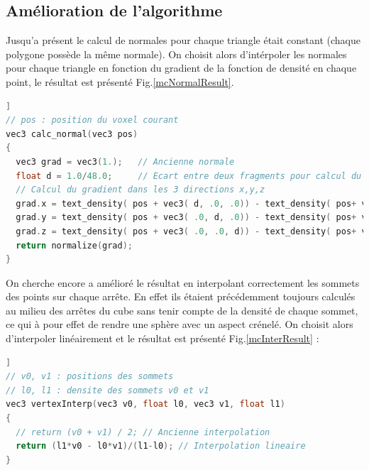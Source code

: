 \documentclass[a4paper]{article}
\begin{document}
\subsection{Amélioration de l'algorithme}

Jusqu'a présent le calcul de normales pour chaque triangle était constant (chaque polygone possède la même normale). On choisit alors d'intérpoler  les normales pour chaque triangle en fonction du gradient de la fonction de densité en chaque point, le résultat est présenté Fig.\ref{mcNormalResult}. 

\begin{lstlisting}[language=C++,
                   directivestyle={\color{black}}
                   emph={int,char,double,float,unsigned},
                   emphstyle={\color{blue}}
                  ]]
// pos : position du voxel courant
vec3 calc_normal(vec3 pos)
{
  vec3 grad = vec3(1.);   // Ancienne normale 
  float d = 1.0/48.0;     // Ecart entre deux fragments pour calcul du gradient
  // Calcul du gradient dans les 3 directions x,y,z
  grad.x = text_density( pos + vec3( d, .0, .0)) - text_density( pos+ vec3(-d, .0, .0));
  grad.y = text_density( pos + vec3( .0, d, .0)) - text_density( pos+ vec3( .0,-d, .0));
  grad.z = text_density( pos + vec3( .0, .0, d)) - text_density( pos+ vec3( .0, .0,-d));
  return normalize(grad);
}
\end{lstlisting}

On cherche encore a amélioré le résultat en interpolant correctement les sommets des points sur chaque arrête. En effet ils étaient précédemment toujours calculés au milieu des arrêtes du cube sans tenir compte de la densité de chaque sommet, ce qui à pour effet de rendre une sphère avec un aspect crénelé. On choisit alors d'interpoler linéairement et le résultat est présenté Fig.\ref{mcInterResult} : 
\begin{lstlisting}[language=C++,
                   directivestyle={\color{black}}
                   emph={int,char,double,float,unsigned},
                   emphstyle={\color{blue}}]]
// v0, v1 : positions des sommets
// l0, l1 : densite des sommets v0 et v1
vec3 vertexInterp(vec3 v0, float l0, vec3 v1, float l1)
{
  // return (v0 + v1) / 2; // Ancienne interpolation
  return (l1*v0 - l0*v1)/(l1-l0); // Interpolation lineaire
}
\end{lstlisting}
\end{document}
